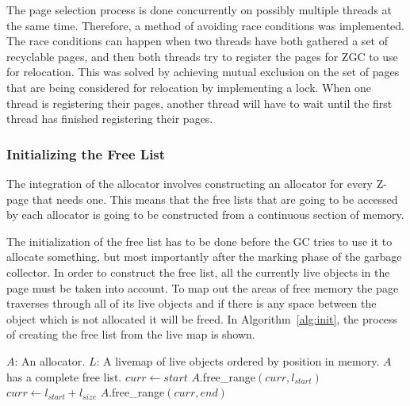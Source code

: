 The page selection process is done concurrently on possibly multiple threads at the same time. Therefore, a method of avoiding race conditions was implemented. The race conditions can happen when two threads have both gathered a set of recyclable pages, and then both threads try to register the pages for ZGC to use for relocation. This was solved by achieving mutual exclusion on the set of pages that are being considered for relocation by implementing a lock. When one thread is registering their pages, another thread will have to wait until the first thread has finished registering their pages.

\subsubsection{Initializing the Free List}
The integration of the allocator involves constructing an allocator for every Z-page that needs one. This means that the free lists that are going to be accessed by each allocator is going to be constructed from a continuous section of memory.

The initialization of the free list has to be done before the GC tries to use it to allocate something, but most importantly after the marking phase of the garbage collector. In order to construct the free list, all the currently live objects in the page must be taken into account. To map out the areas of free memory the page traverses through all of its live objects and if there is any space between the object which is not allocated it will be freed. In Algorithm~\ref{alg:init}, the process of creating the free list from the live map is shown.

\begin{algorithm}{}
    \caption{$(A,L)$}
    \label{alg:init}
    \begin{algorithmic}[1]
        \Require 
        \Statex $A$: An allocator.
        \Statex $L$: A livemap of live objects ordered by position in memory. 
        \Ensure 
        \Statex $A$ has a complete free list.
        \State $curr\gets start$ 
        \State $A$.free\_range$(curr, l_{start})$ 
        \EndIf
        \State $curr\gets l_{start} + l_{size}$ 
        \EndFor
        \State $A$.free\_range$(curr,end)$ 
    \end{algorithmic}
\end{algorithm}

